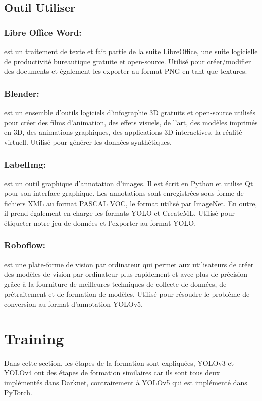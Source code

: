           \subsection{Outil Utiliser}
               \subsubsection{Libre Office Word:} est un traitement de texte et fait partie de la suite LibreOffice, une suite logicielle de productivité bureautique gratuite et open-source. Utilisé pour créer/modifier des documents et également les exporter au format PNG en tant que textures.
               \subsubsection{Blender:} est un ensemble d'outils logiciels d'infographie 3D gratuits et open-source utilisés pour créer des films d'animation, des effets visuels, de l'art, des modèles imprimés en 3D, des animations graphiques, des applications 3D interactives, la réalité virtuell. Utilisé pour générer les données synthétiques. 
               \subsubsection{LabelImg:} est un outil graphique d'annotation d'images. Il est écrit en Python et utilise Qt pour son interface graphique. Les annotations sont enregistrées sous forme de fichiers XML au format PASCAL VOC, le format utilisé par ImageNet. En outre, il prend également en charge les formats YOLO et CreateML. Utilisé pour étiqueter notre jeu de données et l'exporter au format YOLO.  
               \subsubsection{Roboflow:} est une plate-forme de vision par ordinateur qui permet aux utilisateurs de créer des modèles de vision par ordinateur plus rapidement et avec plus de précision grâce à la fourniture de meilleures techniques de collecte de données, de prétraitement et de formation de modèles. Utilisé pour résoudre le problème de conversion au format d'annotation YOLOv5.

\section{Training}
     Dans cette section, les étapes de la formation sont expliquées, YOLOv3 et YOLOv4 ont des étapes de formation similaires car ils sont tous deux implémentés dans Darknet, contrairement à YOLOv5 qui est implémenté dans PyTorch.

